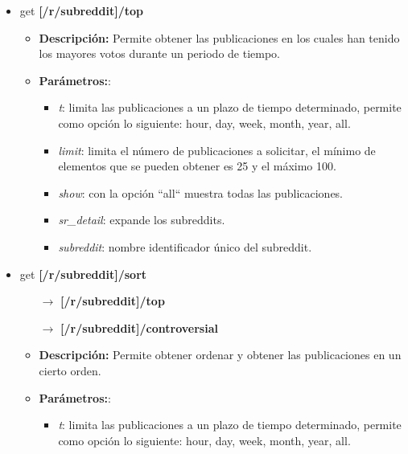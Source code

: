 \documentclass[../../main.tex]{subfiles}
\begin{document}
\begin{itemize}
\begin{itemize}
\begin{itemize}
            \item  \textit{show}: con la opción ``all`` muestra todas las publicaciones.
            
            \item  \textit{sr\_detail}: expande los \glspl{subreddit}.
            
            \item  \textit{subreddit}: nombre identificador único del \gls{subreddit}.
        \end{itemize}
    \end{itemize}
    
    \item \gls{get} \textbf{[/r/subreddit]/top}
    \begin{itemize}
    \item \textbf{Descripción:} Permite obtener las publicaciones en los cuales han tenido los mayores votos durante un periodo de tiempo.
        \item \textbf{Parámetros:}:
        \begin{itemize}
            \item  \textit{t}: limita las publicaciones a un plazo de tiempo determinado, permite como opción lo siguiente: hour, day, week, month, year, all.
            
            \item  \textit{limit}: limita el número de publicaciones a solicitar, el mínimo de elementos que se pueden obtener es 25 y el máximo 100.
            
            \item  \textit{show}: con la opción ``all`` muestra todas las publicaciones.
            
            \item  \textit{sr\_detail}: expande los \glspl{subreddit}.
            
            \item  \textit{subreddit}: nombre identificador único del \gls{subreddit}.
        \end{itemize}
    \end{itemize}
    
    \item \gls{get} \textbf{[/r/subreddit]/sort}
    \begin{itemize}
        \item[$\rightarrow$] \textbf{[/r/subreddit]/top}
        \item[$\rightarrow$] \textbf{[/r/subreddit]/controversial}
    \end{itemize}
    \begin{itemize}
        \item \textbf{Descripción:} Permite obtener ordenar y obtener las publicaciones en un cierto orden.
        \item \textbf{Parámetros:}:
        \begin{itemize}
            \item  \textit{t}: limita las publicaciones a un plazo de tiempo determinado, permite como opción lo siguiente: hour, day, week, month, year, all.
            

\end{itemize}
\end{itemize}
\end{itemize}
\end{document}
